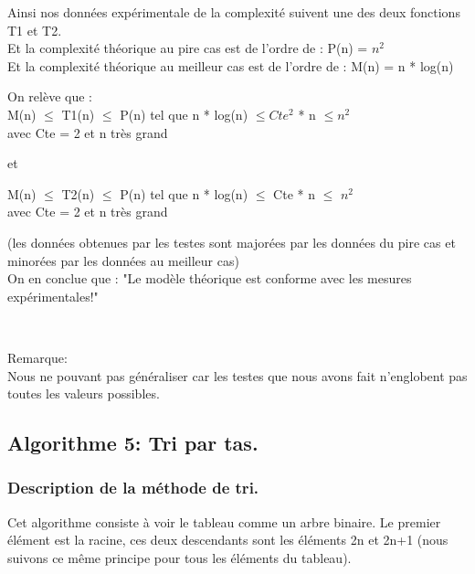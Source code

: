 \documentclass[12pt]{article}
\begin{document}
Ainsi nos données expérimentale de la complexité suivent une des deux fonctions T1 et T2. \\ 
Et la complexité théorique au pire cas est de l'ordre de : P(n) = $n^2$ \\
Et la complexité théorique au meilleur cas est de l'ordre de : M(n) = n * log(n)\\

\begin{center}

On relève que :\\
\color{blue} 
 M(n) $\le$ T1(n) $\le$ P(n) tel que n * log(n) $\le Cte^2$ * n $\le n^2$ \\
\color{black}
 avec Cte = 2 et n très grand\\
 
\end{center}

 et \\
 
\begin{center}

\color{blue} 
 M(n) $\le$ T2(n) $\le$ P(n) tel que n * log(n) $\le$ Cte * n $\le$ $n^2$ \\
\color{black}
 avec Cte = 2 et n très grand\\

\end{center}

 (les données obtenues par les testes sont majorées par les données du pire cas et minorées par les données au meilleur cas)\\
  
  On en conclue que :
\color{red}
 "Le modèle théorique est conforme avec les mesures expérimentales!"\\
\color{black}

\texttt{  }

\color{red}
Remarque:\\
\color{black}
Nous ne pouvant pas généraliser car les testes que nous avons fait n'englobent pas toutes les valeurs possibles.



\newpage




\subsection{Algorithme 5: Tri par tas.}
\subsubsection{Description de la méthode de tri.}
Cet algorithme consiste à voir le tableau comme un arbre binaire. 
Le premier élément est la racine, ces deux descendants sont les éléments 2n et 2n+1 
(nous suivons ce même principe pour tous les éléments du tableau).\\
\end{document}
